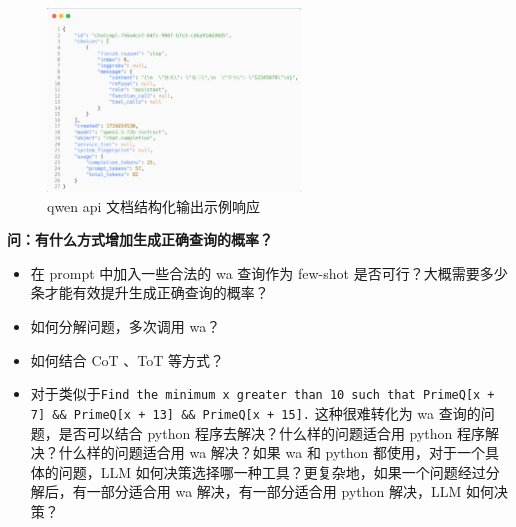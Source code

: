 \begin{frame}
	\begin{figure}
		\includegraphics[width=0.6\textwidth]{./pic/4.png}
		\caption{qwen api 文档结构化输出示例响应}
	\end{figure}
\end{frame}

\begin{frame}
	\textbf{问：有什么方式增加生成正确查询的概率？}
	\begin{itemize}
		\item 在 prompt 中加入一些合法的 wa 查询作为 few-shot 是否可行？大概需要多少条才能有效提升生成正确查询的概率？
		\bigskip
		\item 如何分解问题，多次调用 wa？
		\bigskip
		\item 如何结合 CoT 、ToT 等方式？
		\pause
		\bigskip
		\item 对于类似于\texttt{Find the minimum x greater than 10 such that PrimeQ[x + 7] \&\& PrimeQ[x + 13] \&\& PrimeQ[x + 15].} 这种很难转化为 wa 查询的问题，是否可以结合 python 程序去解决？什么样的问题适合用 python 程序解决？什么样的问题适合用 wa 解决？如果 wa 和 python 都使用，对于一个具体的问题，LLM 如何决策选择哪一种工具？更复杂地，如果一个问题经过分解后，有一部分适合用 wa 解决，有一部分适合用 python 解决，LLM 如何决策？
	\end{itemize}
\end{frame}